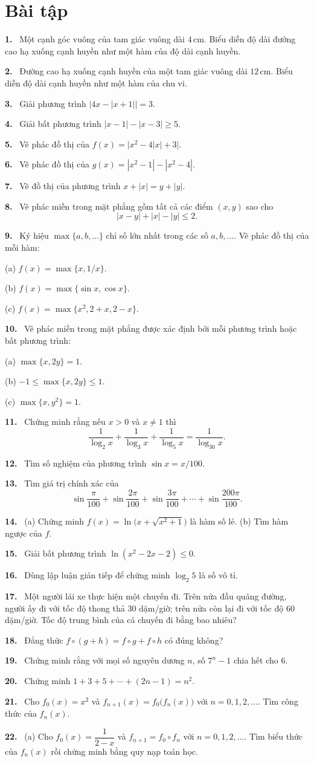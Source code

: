 \documentclass[12pt,a4paper]{article}
\newcommand{\bt}[1]{\par\smallskip\noindent\textbf{#1.}\ }
\begin{document}
\section*{Bài tập}
\bt{1} Một cạnh góc vuông của tam giác vuông dài $4\,\mathrm{cm}$. Biểu diễn độ dài đường cao hạ xuống cạnh huyền như một hàm của độ dài cạnh huyền.
\bt{2} Đường cao hạ xuống cạnh huyền của một tam giác vuông dài $12\,\mathrm{cm}$. Biểu diễn độ dài cạnh huyền như một hàm của chu vi.
\bt{3} Giải phương trình $\bigl|4x-|x+1|\bigr|=3$.
\bt{4} Giải bất phương trình $|x-1|-|x-3|\ge5$.
\bt{5} Vẽ phác đồ thị của $f(x)=\bigl|x^2-4|x|+3\bigr|$.
\bt{6} Vẽ phác đồ thị của $g(x)=|x^2-1|-|x^2-4|$.
\bt{7} Vẽ đồ thị của phương trình $x+|x|=y+|y|$.
\bt{8} Vẽ phác miền trong mặt phẳng gồm tất cả các điểm $(x,y)$ sao cho
\[|x-y|+|x|-|y|\le2.\]
\bt{9} Ký hiệu $\max\{a,b,\ldots\}$ chỉ số lớn nhất trong các số $a,b,\ldots$. Vẽ phác đồ thị của mỗi hàm:

(a) $f(x)=\max\{x,1/x\}$.

(b) $f(x)=\max\{\sin x,\cos x\}$.

(c) $f(x)=\max\{x^2,2+x,2-x\}$.
\bt{10} Vẽ phác miền trong mặt phẳng được xác định bởi mỗi phương trình hoặc bất phương trình:

(a) $\max\{x,2y\}=1$.

(b) $-1\le\max\{x,2y\}\le1$.

(c) $\max\{x,y^2\}=1$.
\bt{11} Chứng minh rằng nếu $x>0$ và $x\ne1$ thì
\[\frac1{\log_2x}+\frac1{\log_3x}+\frac1{\log_5x}=\frac1{\log_{30}x}.\]
\bt{12} Tìm số nghiệm của phương trình $\sin x=x/100$.
\bt{13} Tìm giá trị chính xác của
\[\sin\frac\pi{100}+\sin\frac{2\pi}{100}+\sin\frac{3\pi}{100}+\cdots+\sin\frac{200\pi}{100}.\]
\bt{14} (a) Chứng minh $f(x)=\ln\bigl(x+\sqrt{x^2+1}\bigr)$ là hàm số lẻ. (b) Tìm hàm ngược của $f$.
\bt{15} Giải bất phương trình $\ln(x^2-2x-2)\le0$.
\bt{16} Dùng lập luận gián tiếp để chứng minh $\log_2 5$ là số vô tỉ.
\bt{17} Một người lái xe thực hiện một chuyến đi. Trên nửa đầu quãng đường, người ấy đi với tốc độ thong thả 30 dặm/giờ; trên nửa còn lại đi với tốc độ 60 dặm/giờ. Tốc độ trung bình của cả chuyến đi bằng bao nhiêu?
\bt{18} Đẳng thức $f\circ(g+h)=f\circ g+f\circ h$ có đúng không?
\bt{19} Chứng minh rằng với mọi số nguyên dương $n$, số $7^n-1$ chia hết cho 6.
\bt{20} Chứng minh $1+3+5+\cdots+(2n-1)=n^2$.
\bt{21} Cho $f_0(x)=x^2$ và $f_{n+1}(x)=f_0\bigl(f_n(x)\bigr)$ với $n=0,1,2,\ldots$. Tìm công thức của $f_n(x)$.
\bt{22} (a) Cho $f_0(x)=\dfrac1{2-x}$ và $f_{n+1}=f_0\circ f_n$ với $n=0,1,2,\ldots$. Tìm biểu thức của $f_n(x)$ rồi chứng minh bằng quy nạp toán học.
\end{document}
